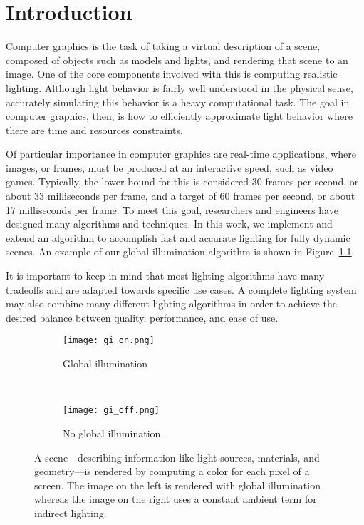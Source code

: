 \chapter{Introduction}
Computer graphics is the task of taking a virtual description of a scene, composed of objects such as models and lights, and rendering that scene to an image. One of the core components involved with this is computing realistic lighting. Although light behavior is fairly well understood in the physical sense, accurately simulating this behavior is a heavy computational task. The goal in computer graphics, then, is how to efficiently approximate light behavior where there are time and resources constraints.


Of particular importance in computer graphics are real-time applications, where images, or frames, must be produced at an interactive speed, such as video games. Typically, the lower bound for this is considered 30 frames per second, or about 33 milliseconds per frame, and a target of 60 frames per second, or about 17 milliseconds per frame. To meet this goal, researchers and engineers have designed many algorithms and techniques.
In this work, we implement and extend an algorithm to accomplish fast and accurate lighting for fully dynamic scenes. An example of our global illumination algorithm is shown in Figure~\ref{fig:introduction_gi}.

It is important to keep in mind that most lighting algorithms have many tradeoffs and are adapted towards specific use cases. A complete lighting system may also combine many different lighting algorithms in order to achieve the desired balance between quality, performance, and ease of use.

\begin{figure}[h]
\centering
    \begin{subfigure}[t]{0.4\textwidth}
        \texttt{[image: gi\_on.png]}
        \caption{Global illumination}
    \end{subfigure}
    ~
    \begin{subfigure}[t]{0.4\textwidth}
        \texttt{[image: gi\_off.png]}
        \caption{No global illumination}
    \end{subfigure}
    \caption{A scene---describing information like light sources, materials, and geometry---is rendered by computing a color for each pixel of a screen. The image on the left is rendered with global illumination whereas the image on the right uses a constant ambient term for indirect lighting.}
    \label{fig:introduction_gi}
\end{figure}

